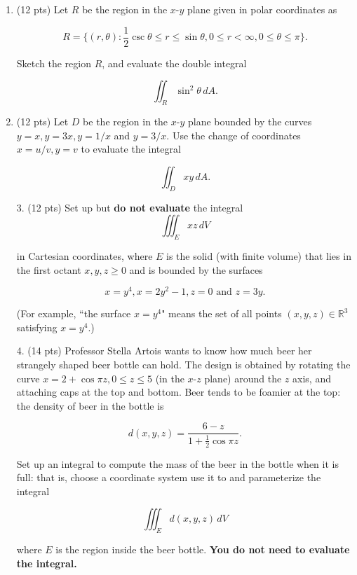 \documentclass[12 pt]{report}
\begin{document}
\newpage
\begin{enumerate}

\item (12 pts) Let $R$ be the region in the $x$-$y$ plane given in polar coordinates as  

$$R = \{(r, \theta): \frac{1}{2} \csc \theta \leq r \leq \sin \theta, 0 \leq r < \infty, 0 \leq \theta \leq \pi\}.$$

Sketch the region $R$, and evaluate the double integral 

$$\iint_R \sin^2\theta \, dA.$$ 

\newpage

\item (12 pts) Let $D$ be the region in the $x$-$y$ plane bounded by the curves $y = x, y = 3x, y = 1/x$ and $y = 3/x$. Use the change of coordinates $x = u/v, y = v$ to evaluate the integral

\[ 
\iint_D xy \, dA.
\]
\newpage

\item[3.] (12 pts) Set up but \textbf{do not evaluate} the integral 
$$\iiint_E xz \, dV$$

in Cartesian coordinates, where $E$ is the solid (with finite volume) that lies in the first octant $x, y, z \geq 0$ and is bounded by the surfaces 

$$x=y^4, x=2y^2-1, z = 0 \text{ and } z=3y.$$

(For example, ``the surface $x=y^4$" means the set of all points $(x,y,z) \in \mathbb{R}^3$ satisfying $x=y^4$.)
\newpage

\item[4.] (14 pts) Professor Stella Artois wants to know how much beer her strangely shaped beer bottle can hold. The design is obtained by rotating the curve $x = 2+\cos \pi z, 0 \leq z \leq 5$ (in the $x$-$z$ plane) around the $z$ axis, and attaching caps at the top and bottom. Beer tends to be foamier at the top: the density of beer in the bottle is 

$$d(x, y, z) = \frac{6-z}{1+\frac{1}{2}\cos \pi z}.$$

Set up an integral to compute the mass of the beer in the bottle when it is full: that is, choose a coordinate system use it to and parameterize the integral

$$\iiint_E d(x,y,z) \, dV$$

where $E$ is the region inside the beer bottle. \textbf{You do not need to evaluate the integral.}




\end{enumerate}
\end{document}
